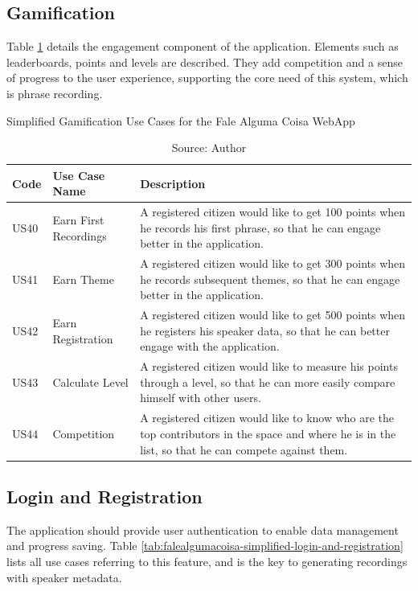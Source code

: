 \subsection{Gamification}

Table \ref{tab:falealgumacoisa-simplified-gamification} details the engagement component of the application. Elements such as leaderboards, points and levels are described. They add competition and a sense of progress to the user experience, supporting the core need of this system, which is phrase recording.

\begin{table}[h]
\caption{Simplified Gamification Use Cases for the Fale Alguma Coisa WebApp}
\label{tab:falealgumacoisa-simplified-gamification}
\centering
\begin{tabular}{|p{1cm}|p{3cm}|p{10cm}|}
\hline
    Code & Use Case Name & Description \\ \hline
    US40 & Earn First Recordings & A registered citizen would like to get 100 points when he records his first phrase, so that he can engage better in the application. \\ \hline
    US41 & Earn Theme & A registered citizen would like to get 300 points when he records subsequent themes, so that he can engage better in the application. \\ \hline
    US42 & Earn Registration & A registered citizen would like to get 500 points when he registers his speaker data, so that he can better engage with the application. \\ \hline
    US43 & Calculate Level & A registered citizen would like to measure his points through a level, so that he can more easily compare himself with other users. \\ \hline
    US44 & Competition & A registered citizen would like to know who are the top contributors in the space and where he is in the list, so that he can compete against them. \\ \hline
\end{tabular}
\caption*{Source: Author}
\end{table}

\subsection{Login and Registration}

The application should provide user authentication to enable data management and progress saving. Table \ref{tab:falealgumacoisa-simplified-login-and-registration} lists all use cases referring to this feature, and is the key to generating recordings with speaker metadata.

